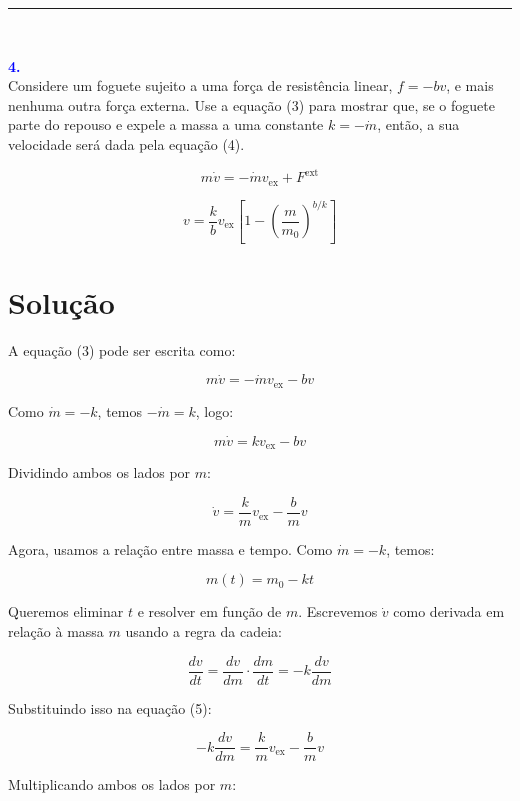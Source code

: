 \documentclass[a4paper,12pt]{article}
\begin{document}
\noindent\rule{\linewidth}{0.4pt}\\

\begin{flushleft}
\textbf{\textcolor{blue}{\Large \textbf{4.}}}\\

Considere um foguete sujeito a uma força de resistência linear, \( f = -bv \), e mais nenhuma outra força externa. 
Use a equação (3) para mostrar que, se o foguete parte do repouso e expele a massa a uma constante \( k = -\dot{m} \), então, 
a sua velocidade será dada pela equação (4).

\begin{equation}
    m \dot{v} = -\dot{m} v_{\text{ex}} + F^{\text{ext}} \tag{3}
\end{equation}

\begin{equation}
    v = \frac{k}{b} v_{\text{ex}} \left[ 1 - \left( \frac{m}{m_0} \right)^{b/k} \right] \tag{4}
\end{equation}

\vspace{0.5cm}
\section*{Solução}

A equação (3) pode ser escrita como:

\[
m \dot{v} = -\dot{m} v_{\text{ex}} - bv
\]

Como \( \dot{m} = -k \), temos \( -\dot{m} = k \), logo:

\[
m \dot{v} = k v_{\text{ex}} - bv
\]

Dividindo ambos os lados por \( m \):

\[
\dot{v} = \frac{k}{m} v_{\text{ex}} - \frac{b}{m} v \tag{5}
\]

Agora, usamos a relação entre massa e tempo. Como \( \dot{m} = -k \), temos:

\[
m(t) = m_0 - kt
\]

Queremos eliminar \( t \) e resolver em função de \( m \). Escrevemos \( \dot{v} \) como derivada em relação à massa \( m \) usando a regra da cadeia:

\[
\frac{dv}{dt} = \frac{dv}{dm} \cdot \frac{dm}{dt} = -k \frac{dv}{dm}
\]

Substituindo isso na equação (5):

\[
-k \frac{dv}{dm} = \frac{k}{m} v_{\text{ex}} - \frac{b}{m} v
\]

Multiplicando ambos os lados por \( m \):


\end{flushleft}
\end{document}
